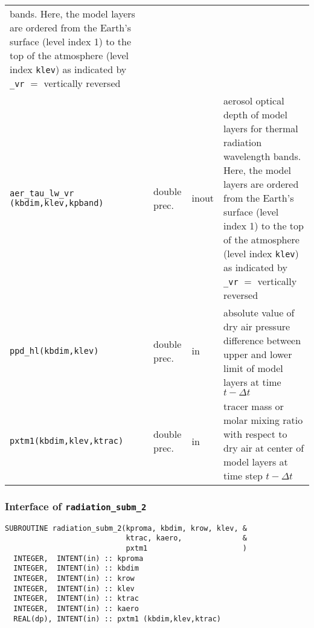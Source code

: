 \begin{longtable}{p{4.5cm}@{\extracolsep\fill}llp{7.0cm}}
bands. Here, the model layers are ordered from the Earth's surface (level
index 1) to the
top of the atmosphere (level index {\tt klev}) as indicated by
{\tt \_vr} $=$ vertically reversed\\
{\tt aer\_tau\_lw\_vr (kbdim,klev,kpband)} & double prec. & inout &
aerosol optical depth of model layers for thermal radiation wavelength
bands. Here, the model layers are ordered from the Earth's surface (level
index 1) to the
top of the atmosphere (level index {\tt klev}) as indicated by
{\tt \_vr} $=$ vertically reversed\\
{\tt ppd\_hl(kbdim,klev)} & double prec. & in & absolute value of dry
air pressure difference between upper and lower limit of model layers
at time $t-\Delta t$\\
{\tt pxtm1(kbdim,klev,ktrac)} & double prec. & in & tracer mass or
molar mixing ratio with respect to dry air at center of model layers at
time step $t-\Delta t$\\
\end{longtable}

\subsubsection{Interface of {\tt radiation\_subm\_2}}

\begin{lstlisting}[caption=radiation\_subm\_2]
SUBROUTINE radiation_subm_2(kproma, kbdim, krow, klev, &
                            ktrac, kaero,              &
                            pxtm1                      )
  INTEGER,  INTENT(in) :: kproma
  INTEGER,  INTENT(in) :: kbdim 
  INTEGER,  INTENT(in) :: krow  
  INTEGER,  INTENT(in) :: klev  
  INTEGER,  INTENT(in) :: ktrac 
  INTEGER,  INTENT(in) :: kaero 
  REAL(dp), INTENT(in) :: pxtm1 (kbdim,klev,ktrac)
\end{lstlisting}

